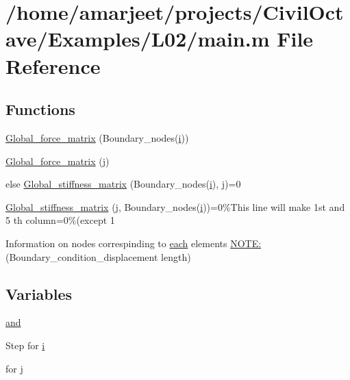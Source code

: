 \hypertarget{a00008}{}\section{/home/amarjeet/projects/\+Civil\+Octave/\+Examples/\+L02/main.m File Reference}
\label{a00008}
\subsection*{Functions}
\begin{DoxyCompactItemize}
\item 
\hyperlink{a00008_a22c0511a90736f47a39b47581e1b823e}{Global\+\_\+force\+\_\+matrix} (Boundary\+\_\+nodes(\hyperlink{a00008_a6dbbc96f4222af2f6c18c8e60f41726b}{i}))
\item 
\hyperlink{a00008_ace29a01cc8b09dba27db5dda97fe13e9}{Global\+\_\+force\+\_\+matrix} (\hyperlink{a00008_ac86694252f8dfdb19aaeadc4b7c342c6}{j})
\item 
else \hyperlink{a00008_a66cbc5292012ccf4747a955f8669ce69}{Global\+\_\+stiffness\+\_\+matrix} (Boundary\+\_\+nodes(\hyperlink{a00008_a6dbbc96f4222af2f6c18c8e60f41726b}{i}), \hyperlink{a00008_ac86694252f8dfdb19aaeadc4b7c342c6}{j})=0
\item 
\hyperlink{a00008_a9476fe4c830b643fa299df9ac0058700}{Global\+\_\+stiffness\+\_\+matrix} (\hyperlink{a00008_ac86694252f8dfdb19aaeadc4b7c342c6}{j}, Boundary\+\_\+nodes(\hyperlink{a00008_a6dbbc96f4222af2f6c18c8e60f41726b}{i}))=0\%This line will make 1st and 5 th column=0\%(except 1
\item 
Information on nodes correspinding to \hyperlink{a00030_a18d9b499a0765bf2fe5f372ff2fc0236}{each} elements \hyperlink{a00008_a12cee0ac1d8aa6ee889f94b55d48769f}{N\+O\+T\+E\+:} (Boundary\+\_\+condition\+\_\+displacement length)
\end{DoxyCompactItemize}
\subsection*{Variables}
\begin{DoxyCompactItemize}
\item 
\hyperlink{a00008_ab56a0e8dabe1e9e6a7fd6913e6448220}{and}
\item 
Step for \hyperlink{a00008_a6dbbc96f4222af2f6c18c8e60f41726b}{i}
\item 
for \hyperlink{a00008_ac86694252f8dfdb19aaeadc4b7c342c6}{j}
\end{DoxyCompactItemize}


